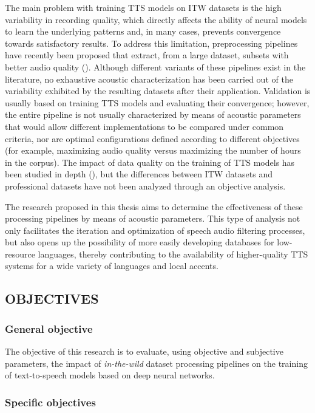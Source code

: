 The main problem with training TTS models on ITW datasets is the high variability in recording quality, which directly affects the ability of neural models to learn the underlying patterns and, in many cases, prevents convergence towards satisfactory results. To address this limitation, preprocessing pipelines have recently been proposed that extract, from a large dataset, subsets with better audio quality (\cite{autoprep}). Although different variants of these pipelines exist in the literature, no exhaustive acoustic characterization has been carried out of the variability exhibited by the resulting datasets after their application. Validation is usually based on training TTS models and evaluating their convergence; however, the entire pipeline is not usually characterized by means of acoustic parameters that would allow different implementations to be compared under common criteria, nor are optimal configurations defined according to different objectives (for example, maximizing audio quality versus maximizing the number of hours in the corpus). The impact of data quality on the training of TTS models has been studied in depth (\cite{improv_tts2}), but the differences between ITW datasets and professional datasets have not been analyzed through an objective analysis.

The research proposed in this thesis aims to determine the effectiveness of these processing pipelines by means of acoustic parameters. This type of analysis not only facilitates the iteration and optimization of speech audio filtering processes, but also opens up the possibility of more easily developing databases for low-resource languages, thereby contributing to the availability of higher-quality TTS systems for a wide variety of languages and local accents.


\subsection{OBJECTIVES}

\subsubsection{General objective}
The objective of this research is to evaluate, using objective and subjective parameters, the impact of \emph{in-the-wild} dataset processing pipelines on the training of text-to-speech models based on deep neural networks.

\subsubsection{Specific objectives}

